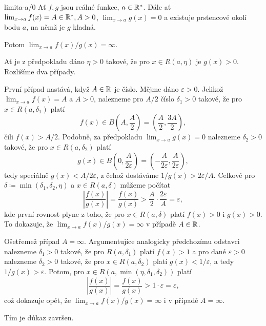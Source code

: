 \begin{proposition}{}{limita-a/0}
 Ať $f,g$ jsou reálné funkce, $a \in \mathbb{R}^{*}$. Dále ať $\lim_{x \to a} f(x) =
 A \in \mathbb{R}^{*}, A > 0$, $\lim_{x \to a} g(x) = 0$ a existuje prstencové okolí
 bodu $a$, na němž je $g$ kladná.

 Potom $\lim_{x \to a} f(x) / g(x) = \infty$.
\end{proposition}
\begin{propproof}
 Ať je z předpokladu dáno $\eta>0$ takové, že pro $x \in R(a,\eta)$ je $g(x) >
 0$. Rozlišíme dva případy.

 První případ nastává, když $A \in \mathbb{R}$ je číslo. Mějme dáno $\varepsilon>0$.
 Jelikož $\lim_{x \to a} f(x) = A$ a $A > 0$, nalezneme pro $A / 2$ číslo
 $\delta_1 > 0$ takové, že pro $x \in R(a,\delta_1)$ platí
 \[
  f(x) \in B \left( A,\frac{A}{2} \right) = \left( \frac{A}{2}, \frac{3A}{2}
  \right),
 \]
 čili $f(x) > A / 2$. Podobně, za předpokladu $\lim_{x \to a} g(x) = 0$
 nalezneme $\delta_2>0$ takové, že pro $x \in R(a,\delta_2)$ platí
 \[
  g(x) \in B \left( 0,\frac{A}{2\varepsilon} \right) =
  \left(-\frac{A}{2\varepsilon},\frac{A}{2\varepsilon}\right),
 \]
 tedy speciálně $g(x) < A / 2\varepsilon$, z čehož dostáváme $1 / g(x) >
 2\varepsilon / A$. Celkově pro $\delta \coloneqq \min(\delta_1,\delta_2,\eta)$
 a $x \in R(a,\delta)$ můžeme počítat
 \[
  \left| \frac{f(x)}{g(x)} \right| = \frac{f(x)}{g(x)} > \frac{A}{2} \cdot
  \frac{2\varepsilon}{A} = \varepsilon,
 \]
 kde první rovnost plyne z toho, že pro $x \in R(a,\delta)$ platí $f(x) > 0$ i
 $g(x) > 0$. To dokazuje, že $\lim_{x \to a} f(x) / g(x) = \infty$ v případě
 $A \in \mathbb{R}$.

 Ošetřemež případ $A = \infty$. Argumentujíce analogicky předchozímu odstavci
 nalezneme $\delta_1>0$ takové, že pro $R(a,\delta_1)$ platí $f(x) > 1$ a pro
 dané $\varepsilon>0$ nalezneme $\delta_2>0$ takové, že pro $x \in
 R(a,\delta_2)$ platí $g(x) < 1 / \varepsilon$, a tedy $1 / g(x) > \varepsilon$.
 Potom, pro $x \in R(a,\min(\eta,\delta_1,\delta_2))$ platí
 \[
  \left| \frac{f(x)}{g(x)} \right| = \frac{f(x)}{g(x)} > 1 \cdot \varepsilon =
  \varepsilon,
 \]
 což dokazuje opět, že $\lim_{x \to a} f(x) / g(x) =\infty$ i v případě $A =
 \infty$. 

 Tím je důkaz završen.
\end{propproof}

